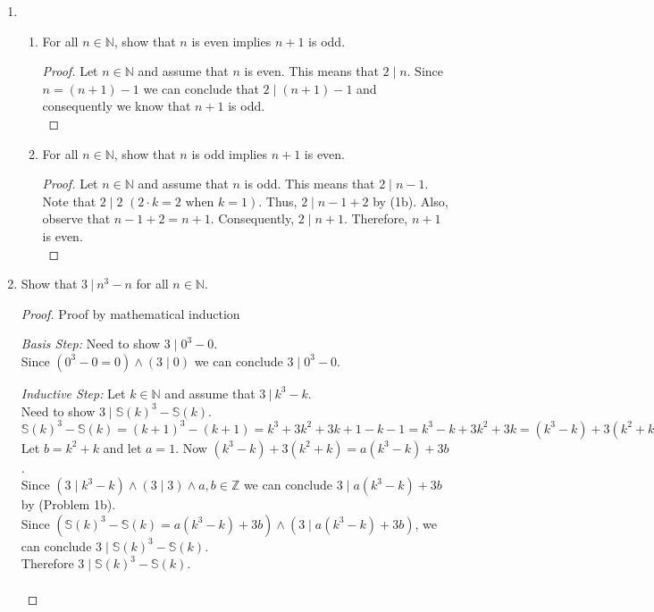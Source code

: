 \documentclass{article}
\newcommand{\naturals}{\mathbb{N}}
\newcommand{\s}{\mathbb{S}}
\newcommand{\divides}{\:\mathbb{|}\: }
\newcommand{\integers}{\mathbb{Z}}
\newenvironment{case}[1][Case]
    {\par\textit{#1:}\hfill\break}
    {}
\begin{document}
\begin{enumerate}
\pagebreak
  \item
    \begin{enumerate}
      \item For all $n \in \naturals$, show that $n$ is even implies $n + 1$ is odd.
        \begin{proof}
          Let $n \in \naturals$ and assume that $n$ is even. This means that $2 \mid n$. Since $n=(n+1)-1$ we can conclude that $2 \mid (n+1)-1$ and consequently we know that $n + 1$ is odd.\\
        \end{proof}
      \item For all $n \in \naturals$, show that $n$ is odd implies $n + 1$ is even.
        \begin{proof}
          Let $n \in \naturals$ and assume that $n$ is odd. This means that $2 \mid n-1$. Note that $2\mid2$ $(2\cdot k=2 \text{ when } k = 1)$. Thus, $2 \mid n-1+2$ by (1b). Also, observe that $n-1+2=n+1$. Consequently, $2\mid n+1$. Therefore, $n + 1$ is even.\\
        \end{proof}
    \end{enumerate}
  \item
    Show that $3 \divides n^3 - n$ for all $n \in \naturals$.
    \begin{proof} Proof by mathematical induction
        \begin{case}[Basis Step]
            Need to show $3\mid0^3-0$.\\
            Since $(0^3-0=0) \land (3\mid0)$ we can conclude $3\mid0^3-0$.
        \end{case}
        \begin{case}[Inductive Step]
            Let $k \in \naturals$ and assume that $3 \divides k^3 - k$.\\
            Need to show $3\mid\s(k)^3-\s(k)$.\\
            $\s(k)^3-\s(k)=(k+1)^3-(k+1)=k^3+3k^2+3k+1-k-1=k^3-k+3k^2+3k=(k^3-k)+3(k^2+k)$\\
            Let $b=k^2+k$ and let $a=1$. Now $(k^3-k)+3(k^2+k)=a(k^3-k)+3b$.\\
            Since $(3 \mid k^3-k) \land (3\mid3)\land a,b\in\integers$ we can conclude $3 \mid a(k^3-k)+3b$ by (Problem 1b).\\
            Since $(\s(k)^3-\s(k)=a(k^3-k)+3b) \land (3 \mid a(k^3-k)+3b)$, we can conclude $3\mid\s(k)^3-\s(k)$.\\
            Therefore $3\mid\s(k)^3-\s(k)$.\\\\

\end{case}
\end{proof}
\end{enumerate}
\end{document}

